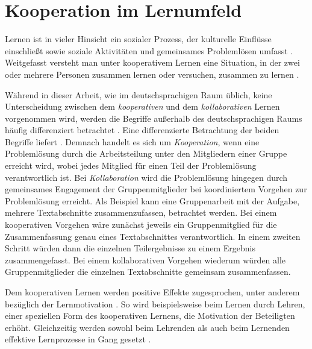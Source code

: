 \section{Kooperation im Lernumfeld}
\label{sec:kooperativeslernen}
\glqq Lernen ist in vieler Hinsicht ein sozialer Prozess, der kulturelle Einflüsse einschließt sowie soziale Aktivitäten und gemeinsames Problemlösen umfasst\grqq{} \citep{reinmann1995kooperation}. %
Weitgefasst versteht man unter kooperativem Lernen eine Situation, in der zwei oder mehrere Personen zusammen lernen oder versuchen, zusammen zu lernen \citep{dillenbourg1999collaborative}.

Während in dieser Arbeit, wie im deutschsprachigen Raum üblich, keine Unterscheidung zwischen dem \textit{kooperativen} und dem \textit{kollaborativen} Lernen vorgenommen wird, werden die Begriffe außerhalb des deutschsprachigen Raums häufig differenziert betrachtet \citep{reinmann2002analyse}. Eine differenzierte Betrachtung der beiden Begriffe liefert \cite{dillenbourg1995evolution}. Demnach handelt es sich um \textit{Kooperation}, wenn eine Problemlösung durch die Arbeitsteilung unter den Mitgliedern einer Gruppe erreicht wird, wobei jedes Mitglied für einen Teil der Problemlösung verantwortlich ist.
Bei \textit{Kollaboration} wird die Problemlösung hingegen durch gemeinsames Engagement der Gruppenmitglieder bei koordiniertem Vorgehen zur Problemlösung erreicht.
Als Beispiel kann eine Gruppenarbeit mit der Aufgabe, mehrere Textabschnitte zusammenzufassen, betrachtet werden.
Bei einem kooperativen Vorgehen wäre zunächst jeweils ein Gruppenmitglied für die Zusammenfassung genau eines Textabschnittes verantwortlich. In einem zweiten Schritt würden dann die einzelnen Teilergebnisse zu einem Ergebnis zusammengefasst. Bei einem kollaborativen Vorgehen wiederum würden alle Gruppenmitglieder die einzelnen Textabschnitte gemeinsam zusammenfassen.

Dem kooperativen Lernen werden positive Effekte zugesprochen, unter anderem bezüglich der Lernmotivation \citep{reinmann1995kooperation,dillenbourg1999collaborative}. So wird beispielsweise beim Lernen durch Lehren, einer speziellen Form des kooperativen Lernens, die Motivation der Beteiligten erhöht. Gleichzeitig werden sowohl beim Lehrenden als auch beim Lernenden effektive Lernprozesse in Gang gesetzt \citep{reinmann1995kooperation}.

